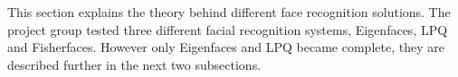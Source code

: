 This section explains the theory behind different face recognition solutions. The project group tested three different facial recognition systems, Eigenfaces, LPQ and Fisherfaces. However only Eigenfaces and LPQ became complete, they are described further in the next two subsections.